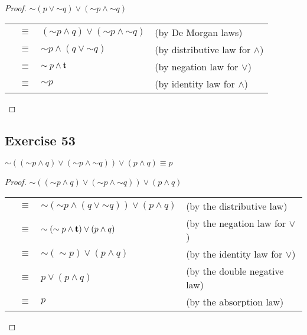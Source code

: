\documentclass[14pt]{extarticle}
\newcommand{\true}{{\bf t}}
\begin{document}
\begin{proof}
    ${\sim (p \vee {\sim q})} \vee ({\sim p} \wedge {\sim q})$

    \begin{tabular}{rcll}
         & $\equiv$ & $({\sim p} \wedge q) \vee ({\sim p} \wedge {\sim q})$ & (by De Morgan laws)                \\
         & $\equiv$ & ${\sim p} \wedge (q \vee {\sim q})$                   & (by distributive law for $\wedge$) \\
         & $\equiv$ & ${\sim p} \wedge \true$                               & (by negation law for $\vee$)       \\
         & $\equiv$ & ${\sim p}$                                            & (by identity law for $\wedge$)     \\\end{tabular}
\end{proof}

\subsection{Exercise 53} $\sim(({\sim p} \wedge q) \vee ({\sim p} \wedge {\sim
        q})) \vee (p \wedge q) \equiv p$

\begin{proof} $\sim(({\sim p} \wedge q) \vee ({\sim p} \wedge {\sim q})) \vee (p
        \wedge q)$

    \begin{tabular}{rcll}
                                  & $\equiv$                         & $\sim({\sim p} \wedge (q \vee {\sim q})) \vee
        (p \wedge q)$             & (by the distributive law)                                                                                           \\
                                  & $\equiv$                         & $\sim({\sim p} \wedge
        \true) \vee (p \wedge q)$ & (by the negation law for $\vee$)                                                                                    \\
                                  & $\equiv$                         & $\sim({\sim p}) \vee (p \wedge q)$            & (by the identity law for $\vee$) \\
                                  & $\equiv$                         & $p \vee (p \wedge q)$                         & (by the double negative law)     \\
                                  & $\equiv$                         & $p$                                           & (by the absorption law)          \\
    \end{tabular}
\end{proof}
\end{document}
